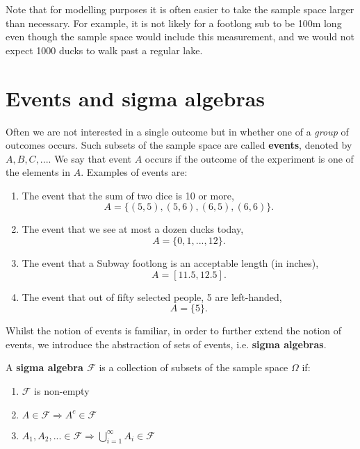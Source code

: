 Note that for modelling purposes it is often easier to take the sample 
space larger than necessary. For example, it is not likely for a footlong 
sub to be 100m long even though the sample space would include this measurement, 
and we would not expect 1000 ducks to walk past a regular lake. 

\section{Events and sigma algebras}

Often we are not interested in a single outcome but in whether 
one of a \textit{group} of outcomes occurs. Such subsets 
of the sample space are called \textbf{events}, denoted by \(A, B, C, ...\). 
We say that event \(A\) occurs if the outcome of the experiment is one of the elements in \(A\). 
\medskip
Examples of events are:

\begin{enumerate}
    \item The event that the sum of two dice is 10 or more, \[A = \{(5,5),(5,6),(6,5),(6,6)\}.\]
    \item The event that we see at most a dozen ducks today, \[A = \{0, 1, ..., 12\}.\]
    \item The event that a Subway footlong is an acceptable length (in inches), \[A = [11.5,12.5].\]
    \item The event that out of fifty selected people, 5 are left-handed, \[A = \{5\}.\]
\end{enumerate}


Whilst the notion of events is familiar, in order to further extend 
the notion of events, we introduce the abstraction of sets of events, i.e. \textbf{sigma algebras}. 


\begin{definition}\label{defn:sigma algebra}
    A \textbf{sigma algebra \(\mathcal{F}\)} is a collection of 
    subsets of the sample space \(\Omega\) if:
    \begin{enumerate}
        \item \(\mathcal{F}\) is non-empty
        \item \(A\in\mathcal{F}\Rightarrow A^c\in\mathcal{F}\)
        \item \(A_1, A_2,...\in\mathcal{F}\Rightarrow \bigcup_{i=1}^\infty A_i\in\mathcal{F}\)
    \end{enumerate}
\end{definition}

